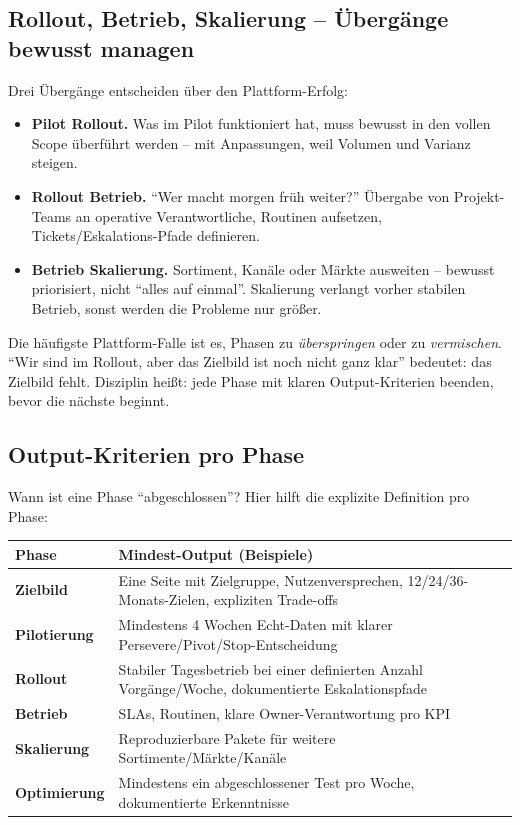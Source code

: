 \documentclass[11pt,a4paper,oneside]{article}
\begin{document}
\subsection{Rollout, Betrieb, Skalierung -- Übergänge bewusst managen}

Drei Übergänge entscheiden über den Plattform-Erfolg:

\begin{itemize}
  \item \textbf{Pilot \textrightarrow{} Rollout.} Was im Pilot funktioniert hat, muss bewusst in den vollen Scope überführt werden -- mit Anpassungen, weil Volumen und Varianz steigen.
  \item \textbf{Rollout \textrightarrow{} Betrieb.} ``Wer macht morgen früh weiter?'' Übergabe von Projekt-Teams an operative Verantwortliche, Routinen aufsetzen, Tickets/Eskalations-Pfade definieren.
  \item \textbf{Betrieb \textrightarrow{} Skalierung.} Sortiment, Kanäle oder Märkte ausweiten -- bewusst priorisiert, nicht ``alles auf einmal''. Skalierung verlangt vorher stabilen Betrieb, sonst werden die Probleme nur größer.
\end{itemize}

\begin{merkbox}
Die häufigste Plattform-Falle ist es, Phasen zu \emph{überspringen} oder zu \emph{vermischen}. ``Wir sind im Rollout, aber das Zielbild ist noch nicht ganz klar'' bedeutet: das Zielbild fehlt. Disziplin heißt: jede Phase mit klaren Output-Kriterien beenden, bevor die nächste beginnt.
\end{merkbox}

\subsection{Output-Kriterien pro Phase}

Wann ist eine Phase ``abgeschlossen''? Hier hilft die explizite Definition pro Phase:

\begin{tabularx}{\linewidth}{@{}>{\bfseries}lX@{}}
\toprule
Phase & Mindest-Output (Beispiele) \\
\midrule
Zielbild     & Eine Seite mit Zielgruppe, Nutzenversprechen, 12/24/36-Monats-Zielen, expliziten Trade-offs \\
Pilotierung  & Mindestens 4 Wochen Echt-Daten mit klarer Persevere/Pivot/Stop-Entscheidung \\
Rollout      & Stabiler Tagesbetrieb bei einer definierten Anzahl Vorgänge/Woche, dokumentierte Eskalationspfade \\
Betrieb      & SLAs, Routinen, klare Owner-Verantwortung pro KPI \\
Skalierung   & Reproduzierbare Pakete für weitere Sortimente/Märkte/Kanäle \\
Optimierung  & Mindestens ein abgeschlossener Test pro Woche, dokumentierte Erkenntnisse \\
\bottomrule
\end{tabularx}
\end{document}
